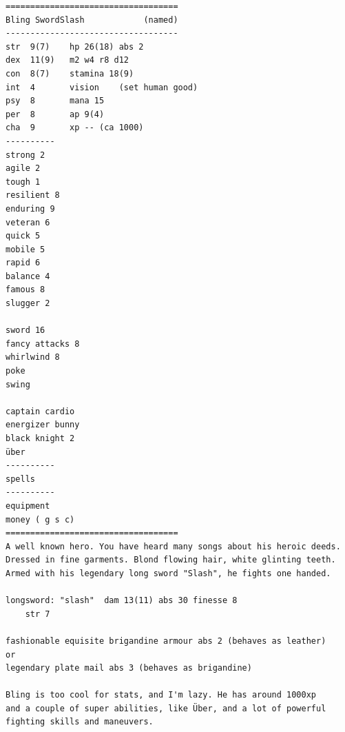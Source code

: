 \documentclass[11pt, twoside, titlepage, a4paper]{report}
\begin{document}
\goodbreak \begin{samepage} \small \begin{verbatim}
===================================
Bling SwordSlash            (named)
-----------------------------------
str  9(7)    hp 26(18) abs 2
dex  11(9)   m2 w4 r8 d12
con  8(7)    stamina 18(9)
int  4       vision    (set human good)
psy  8       mana 15
per  8       ap 9(4)
cha  9       xp -- (ca 1000)
----------
strong 2
agile 2
tough 1
resilient 8
enduring 9
veteran 6
quick 5
mobile 5
rapid 6
balance 4
famous 8
slugger 2

sword 16
fancy attacks 8
whirlwind 8
poke
swing

captain cardio
energizer bunny
black knight 2
über
----------
spells
----------
equipment
money ( g s c)
===================================
A well known hero. You have heard many songs about his heroic deeds.
Dressed in fine garments. Blond flowing hair, white glinting teeth.
Armed with his legendary long sword "Slash", he fights one handed.

longsword: "slash"  dam 13(11) abs 30 finesse 8
    str 7

fashionable equisite brigandine armour abs 2 (behaves as leather)
or
legendary plate mail abs 3 (behaves as brigandine)

Bling is too cool for stats, and I'm lazy. He has around 1000xp
and a couple of super abilities, like Über, and a lot of powerful
fighting skills and maneuvers.
\end{verbatim} \normalsize \end{samepage}


\flushbottom



























\clearpage
{}
\end{document}
